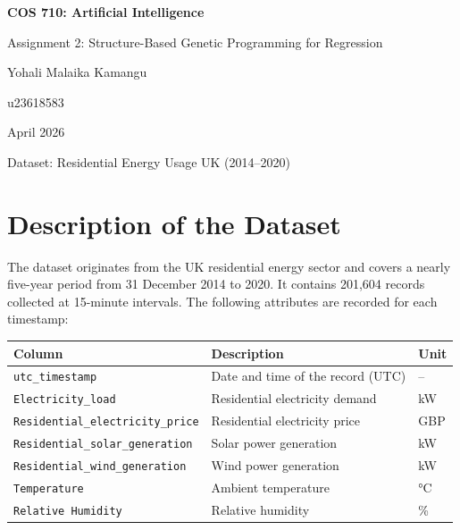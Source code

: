 \documentclass[12pt,a4paper]{article}
\begin{document}
\begin{titlepage}
    \centering
    \vspace*{2cm}
    {\LARGE\bfseries COS 710: Artificial Intelligence\par}
    \vspace{0.5cm}
    {\Large Assignment 2: Structure-Based Genetic Programming for Regression\par}
    \vspace{1.5cm}
    {\large Yohali Malaika Kamangu\par}
    {\large u23618583\par}
    \vspace{0.5cm}
    {\large April 2026\par}
    \vspace{1.5cm}
    {\normalsize Dataset: Residential Energy Usage UK (2014--2020)\par}
\end{titlepage}

\tableofcontents
\newpage

\section{Description of the Dataset}

The dataset originates from the UK residential energy sector and covers a nearly
five-year period from 31 December 2014 to 2020. It contains 201,604 records
collected at 15-minute intervals. The following attributes are recorded for each
timestamp:

\begin{center}
\begin{tabular}{@{}L{6.5cm}L{5.5cm}C{1.5cm}@{}}
\toprule
\textbf{Column} & \textbf{Description} & \textbf{Unit} \\
\midrule
\texttt{utc\_timestamp} & Date and time of the record (UTC) & -- \\
\texttt{Electricity\_load} & Residential electricity demand & kW \\
\texttt{Residential\_electricity\_price} & Residential electricity price & GBP \\
\texttt{Residential\_solar\_generation} & Solar power generation & kW \\
\texttt{Residential\_wind\_generation} & Wind power generation & kW \\
\texttt{Temperature} & Ambient temperature & °C \\
\texttt{Relative Humidity} & Relative humidity & \% \\
\bottomrule
\end{tabular}
\end{center}
\end{document}
